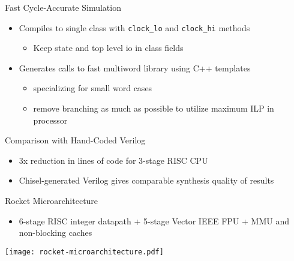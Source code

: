 \documentclass[xcolor=pdflatex,dvipsnames,table]{beamer}
\begin{document}
\begin{frame}[fragile]{Fast Cycle-Accurate Simulation}

\begin{itemize}
\item Compiles to single class with \verb+clock_lo+ and \verb+clock_hi+ methods
\begin{itemize}
\item Keep state and top level io in class fields
\end{itemize}
\item Generates calls to fast multiword library using C++ templates 
\begin{itemize}
\item specializing for small word cases
\item remove branching as much as possible to utilize maximum ILP in processor
\end{itemize}
\end{itemize}

\end{frame}

\begin{frame}{Comparison with Hand-Coded Verilog}

\begin{itemize}
\item 3x reduction in lines of code for 3-stage RISC CPU
\item Chisel-generated Verilog gives comparable synthesis quality of results
\end{itemize}

\end{frame}

\begin{frame}[fragile]{Rocket Microarchitecture}

\begin{itemize}
\item 6-stage RISC integer datapath + 5-stage Vector IEEE FPU + MMU and non-blocking caches
\end{itemize}
\texttt{[image: rocket-microarchitecture.pdf]}

\end{frame}
\end{document}
